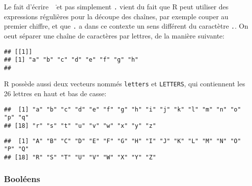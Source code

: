 \noident Le fait d'écrire \texttt{\ \.} et pas simplement \texttt{.} vient du fait que R peut utiliser des expressions régulières pour la découpe des chaînes,
par exemple couper au premier chiffre, et que \texttt{.} a dans ce contexte un sens différent du caractètre \texttt{.}.
On oeut séparer une chaîne de caractères par lettres, de la manière suivante:

\begin{knitrout}
\color{fgcolor}\begin{kframe}
\begin{flushleft}
\ttfamily\noindent
{}\hlkeyword{(}\hlkeyword{,}{\ }\hlkeyword{)}\mbox{}
\normalfont
\end{flushleft}
\begin{verbatim}
## [[1]]
## [1] "a" "b" "c" "d" "e" "f" "g" "h"
## 
\end{verbatim}
\end{kframe}
\end{knitrout}


R possède aussi deux vecteurs nommés \texttt{letters} et \texttt{LETTERS}, qui contiennent les 26 lettres en haut et bas de casse:

\begin{knitrout}
\color{fgcolor}\begin{kframe}
\begin{flushleft}
\ttfamily\noindent
{}\mbox{}
\normalfont
\end{flushleft}
\begin{verbatim}
##  [1] "a" "b" "c" "d" "e" "f" "g" "h" "i" "j" "k" "l" "m" "n" "o" "p" "q"
## [18] "r" "s" "t" "u" "v" "w" "x" "y" "z"
\end{verbatim}
\begin{flushleft}
\ttfamily\noindent
{}\mbox{}
\normalfont
\end{flushleft}
\begin{verbatim}
##  [1] "A" "B" "C" "D" "E" "F" "G" "H" "I" "J" "K" "L" "M" "N" "O" "P" "Q"
## [18] "R" "S" "T" "U" "V" "W" "X" "Y" "Z"
\end{verbatim}
\end{kframe}
\end{knitrout}


\subsubsection{Booléens}

